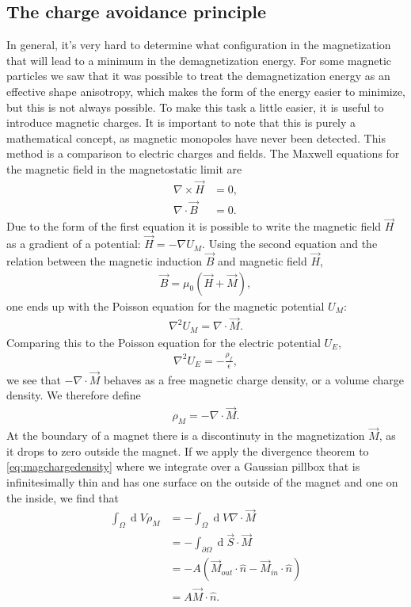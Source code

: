 \documentclass[12pt, a4paper]{article}		%
\renewcommand{\d}[1]{\ensuremath{\operatorname{d}\!{#1}}}
\numberwithin{equation}{section}
\begin{document}
\subsection{The charge avoidance principle}
In general, it's very hard to determine what configuration in the magnetization that will lead to a minimum in the demagnetization energy. For some magnetic particles we saw that it was possible to treat the demagnetization energy as an effective shape anisotropy, which makes the form of the energy easier to minimize, but this is not always possible. To make this task a little easier, it is useful to introduce magnetic charges. It is important to note that this is purely a mathematical concept, as magnetic monopoles have never been detected. This method is a comparison to electric charges and fields. The Maxwell equations for the magnetic field in the magnetostatic limit are
\begin{align}
\nabla \times \vec{H} &= 0, \\
\nabla \cdot \vec{B} &= 0.
\end{align}
Due to the form of the first equation it is possible to write the magnetic field $\vec{H}$ as a gradient of a potential: $\vec{H} = -\nabla U_M$. Using the second equation and the relation between the magnetic induction $\vec{B}$ and magnetic field $\vec{H}$, 
\begin{align}
\vec{B} = \mu_0(\vec{H}+\vec{M}),
\end{align}
one ends up with the Poisson equation for the magnetic potential $U_M$:
\begin{align}
\nabla^2 U_M = \nabla \cdot \vec{M}.
\end{align}
Comparing this to the Poisson equation for the electric potential $U_E$,
\begin{align}
\nabla^2 U_E = -\frac{\rho_f}{\epsilon},
\end{align}
we see that $-\nabla \cdot \vec{M}$ behaves as a free magnetic charge density, or a volume charge density. We therefore define
\begin{align}
\label{eq:magchargedensity}
\rho_M = - \nabla \cdot \vec{M}.
\end{align}
At the boundary of a magnet there is a discontinuty in the magnetization $\vec{M}$, as it drops to zero outside the magnet. If we apply the divergence theorem to \eqref{eq:magchargedensity} where we integrate over a Gaussian pillbox that is infinitesimally thin and has one surface on the outside of the magnet and one on the inside, we find that
\begin{align*}
\int_{\Omega} \d V \rho_M  &= -\int_{\Omega} \d V \nabla \cdot \vec{M} \\
&= -\int_{\partial \Omega} \d {\vec{S}}\cdot\vec{M} \\
&= -A(\vec{M}_{out}\cdot\hat{n} - \vec{M}_{in} \cdot \hat{n}) \\
&= A \vec{M} \cdot\hat{n}.
\end{align*}
\end{document}
